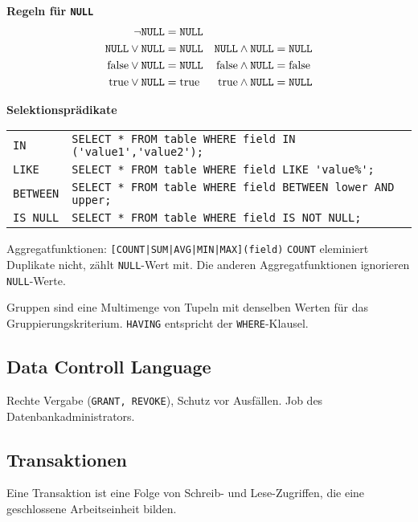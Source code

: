 \textbf{Regeln für \texttt{NULL}}
\begin{align*}
	\neg \mbox{\texttt{NULL}}& = \mbox{\texttt{NULL}} & &\\
	\mbox{\texttt{NULL}} \vee \mbox{\texttt{NULL}}& = \mbox{\texttt{NULL}} &
	\mbox{\texttt{NULL}} \wedge \mbox{\texttt{NULL}}& = \mbox{\texttt{NULL}}\\
	\mbox{false} \vee \mbox{\texttt{NULL}} & = \mbox{\texttt{NULL}} & 
	\mbox{false} \wedge \mbox{\texttt{NULL}} & = \mbox{false}\\
	\mbox{true} \vee \mbox{\texttt{NULL}} & = \mbox{true} & 
	\mbox{true} \wedge \mbox{\texttt{NULL}} & = \mbox{\texttt{NULL}}\\	
\end{align*}

\textbf{Selektionsprädikate}
\begin{tabular}{
	@{}p{\the\MyLenA}%
	@{}p{\linewidth-\the\MyLenA}}
	\texttt{IN} & \lstinline$SELECT * FROM table WHERE field IN ('value1','value2');$\\
	\texttt{LIKE} & \lstinline$SELECT * FROM table WHERE field LIKE 'value%';$\\
	\texttt{BETWEEN} & \lstinline$SELECT * FROM table WHERE field BETWEEN lower AND upper;$\\
	\texttt{IS NULL} & \lstinline$SELECT * FROM table WHERE field IS NOT NULL;$\\
\end{tabular}

Aggregatfunktionen: \lstinline$[COUNT|SUM|AVG|MIN|MAX](field)$
\texttt{COUNT} eleminiert Duplikate nicht, zählt \texttt{NULL}-Wert mit. Die anderen Aggregatfunktionen ignorieren
\texttt{NULL}-Werte.

Gruppen sind eine Multimenge von Tupeln mit denselben Werten für das Gruppierungskriterium. \texttt{HAVING} entspricht
der \texttt{WHERE}-Klausel.

\subsection{Data Controll Language}
Rechte Vergabe (\texttt{GRANT, REVOKE}), Schutz vor Ausfällen. Job des Datenbankadministrators.

\subsection{Transaktionen}
Eine Transaktion ist eine Folge von Schreib- und Lese-Zugriffen, die eine geschlossene Arbeitseinheit bilden.

